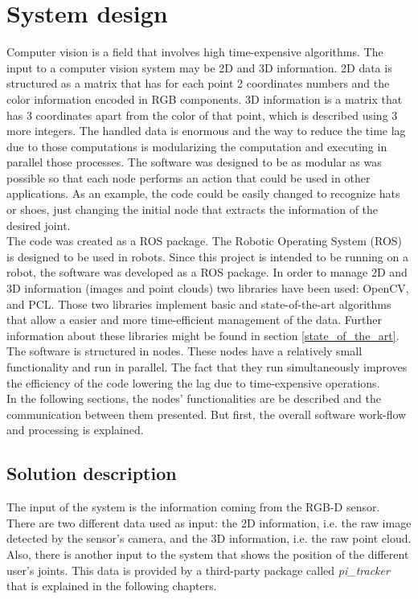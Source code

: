 \section{System design}
\label{system_design}
Computer vision is a field that involves high time-expensive algorithms. 
The input to a computer vision system may be 2D and 3D information. 
2D data is structured as a matrix that has for each point 2 coordinates numbers and the color information encoded in RGB components. 
3D information is a matrix that has 3 coordinates apart from the color of that point, which is described using 3 more integers. 
The handled data is enormous and the way to reduce the time lag due to those computations is modularizing the computation and executing in parallel those processes. 
The software was designed to be as modular as was possible so that each node performs an action that could be used in other applications. 
As an example, the code could be easily changed to recognize hats or shoes, just changing the initial node that extracts the information of the desired joint. 
\\

The code was created as a ROS package. 
The Robotic Operating System (ROS) is designed to be used in robots. 
Since this project is intended to be running on a robot, the software was developed as a ROS package. 
In order to manage 2D and 3D information (images and point clouds) two libraries have been used: OpenCV, and PCL. Those two libraries implement basic and state-of-the-art algorithms that allow a easier and more time-efficient management of the data. Further information about these libraries might be found in section \ref{state_of_the_art}. 
\\
The software is structured in nodes. 
These nodes have a relatively small functionality and run in parallel. 
The fact that they run simultaneously improves the efficiency of the code lowering the lag due to time-expensive operations. 
\\

In the following sections, the nodes' functionalities are be described and the communication between them presented. 
But first, the overall software work-flow and processing is explained. 


\subsection{Solution description}

The input of the system is the information coming from the RGB-D sensor. 
There are two different data used as input: the 2D information, i.e. the raw image detected by the sensor's camera, and the 3D information, i.e. the raw point cloud. 
Also, there is another input to the system that shows the position of the different user's joints. This data is provided by a third-party package called \textit{pi\_tracker} that is explained in the following chapters. 
\\


